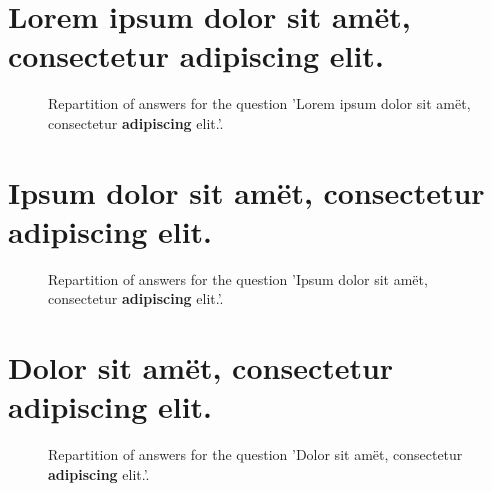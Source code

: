 \documentclass[12pt]{article}
\begin{document}
\clearpage{}
\section{Lorem ipsum dolor sit amët, consectetur\textbf{  adipiscing } elit.}

\label{sec:4}


\begin{figure}[h!]
    \caption{\label{figure:q4-1}Repartition of answers for the question 'Lorem ipsum dolor sit amët, consectetur\textbf{  adipiscing } elit.'.}
\end{figure}



\clearpage{}
\section{Ipsum dolor sit amët, consectetur \textbf{ adipiscing } elit.}

\label{sec:5}


\begin{figure}[h!]
    \caption{\label{figure:q5-1}Repartition of answers for the question 'Ipsum dolor sit amët, consectetur \textbf{ adipiscing } elit.'.}
\end{figure}



\clearpage{}
\section{Dolor sit amët, consectetur\textbf{  adipiscing}  elit.}

\label{sec:6}


\begin{figure}[h!]
    \caption{\label{figure:q6-1}Repartition of answers for the question 'Dolor sit amët, consectetur\textbf{  adipiscing}  elit.'.}
\end{figure}
\end{document}
